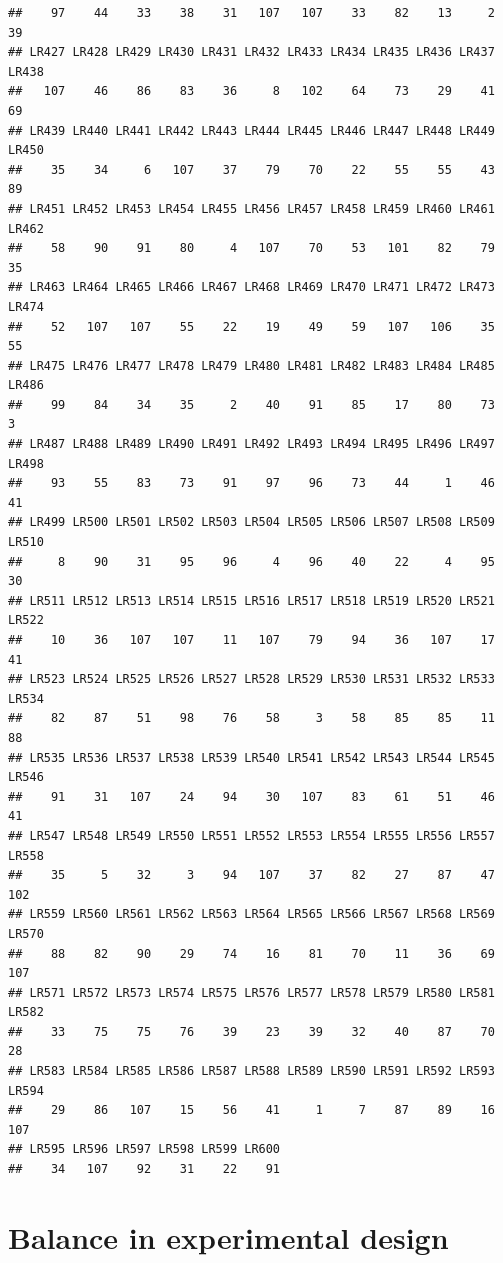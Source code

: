 \documentclass[]{book}
\begin{document}
\begin{verbatim}
##    97    44    33    38    31   107   107    33    82    13     2    39 
## LR427 LR428 LR429 LR430 LR431 LR432 LR433 LR434 LR435 LR436 LR437 LR438 
##   107    46    86    83    36     8   102    64    73    29    41    69 
## LR439 LR440 LR441 LR442 LR443 LR444 LR445 LR446 LR447 LR448 LR449 LR450 
##    35    34     6   107    37    79    70    22    55    55    43    89 
## LR451 LR452 LR453 LR454 LR455 LR456 LR457 LR458 LR459 LR460 LR461 LR462 
##    58    90    91    80     4   107    70    53   101    82    79    35 
## LR463 LR464 LR465 LR466 LR467 LR468 LR469 LR470 LR471 LR472 LR473 LR474 
##    52   107   107    55    22    19    49    59   107   106    35    55 
## LR475 LR476 LR477 LR478 LR479 LR480 LR481 LR482 LR483 LR484 LR485 LR486 
##    99    84    34    35     2    40    91    85    17    80    73     3 
## LR487 LR488 LR489 LR490 LR491 LR492 LR493 LR494 LR495 LR496 LR497 LR498 
##    93    55    83    73    91    97    96    73    44     1    46    41 
## LR499 LR500 LR501 LR502 LR503 LR504 LR505 LR506 LR507 LR508 LR509 LR510 
##     8    90    31    95    96     4    96    40    22     4    95    30 
## LR511 LR512 LR513 LR514 LR515 LR516 LR517 LR518 LR519 LR520 LR521 LR522 
##    10    36   107   107    11   107    79    94    36   107    17    41 
## LR523 LR524 LR525 LR526 LR527 LR528 LR529 LR530 LR531 LR532 LR533 LR534 
##    82    87    51    98    76    58     3    58    85    85    11    88 
## LR535 LR536 LR537 LR538 LR539 LR540 LR541 LR542 LR543 LR544 LR545 LR546 
##    91    31   107    24    94    30   107    83    61    51    46    41 
## LR547 LR548 LR549 LR550 LR551 LR552 LR553 LR554 LR555 LR556 LR557 LR558 
##    35     5    32     3    94   107    37    82    27    87    47   102 
## LR559 LR560 LR561 LR562 LR563 LR564 LR565 LR566 LR567 LR568 LR569 LR570 
##    88    82    90    29    74    16    81    70    11    36    69   107 
## LR571 LR572 LR573 LR574 LR575 LR576 LR577 LR578 LR579 LR580 LR581 LR582 
##    33    75    75    76    39    23    39    32    40    87    70    28 
## LR583 LR584 LR585 LR586 LR587 LR588 LR589 LR590 LR591 LR592 LR593 LR594 
##    29    86   107    15    56    41     1     7    87    89    16   107 
## LR595 LR596 LR597 LR598 LR599 LR600 
##    34   107    92    31    22    91
\end{verbatim}

\hypertarget{balance-in-experimental-design}{%
\section{Balance in experimental design}\label{balance-in-experimental-design}}
\end{document}
